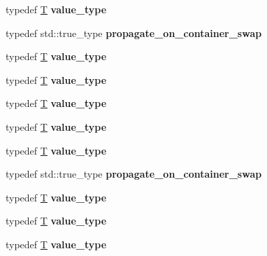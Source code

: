 \begin{DoxyCompactItemize}
typedef \mbox{\hyperlink{struct_t}{T}} {\bfseries value\+\_\+type}
\item 
\mbox{\label{structsome__alloc_aad61c49c6ad5f1ca6dfb3f5d38d70d57}} 
typedef std\+::true\+\_\+type {\bfseries propagate\+\_\+on\+\_\+container\+\_\+swap}
\item 
\mbox{\label{structsome__alloc_a41022544a2b3ffeb4ffce92f759eb30b}} 
typedef \mbox{\hyperlink{struct_t}{T}} {\bfseries value\+\_\+type}
\item 
\mbox{\label{structsome__alloc_a41022544a2b3ffeb4ffce92f759eb30b}} 
typedef \mbox{\hyperlink{struct_t}{T}} {\bfseries value\+\_\+type}
\item 
\mbox{\label{structsome__alloc_a41022544a2b3ffeb4ffce92f759eb30b}} 
typedef \mbox{\hyperlink{struct_t}{T}} {\bfseries value\+\_\+type}
\item 
\mbox{\label{structsome__alloc_a41022544a2b3ffeb4ffce92f759eb30b}} 
typedef \mbox{\hyperlink{struct_t}{T}} {\bfseries value\+\_\+type}
\item 
\mbox{\label{structsome__alloc_a41022544a2b3ffeb4ffce92f759eb30b}} 
typedef \mbox{\hyperlink{struct_t}{T}} {\bfseries value\+\_\+type}
\item 
\mbox{\label{structsome__alloc_aad61c49c6ad5f1ca6dfb3f5d38d70d57}} 
typedef std\+::true\+\_\+type {\bfseries propagate\+\_\+on\+\_\+container\+\_\+swap}
\item 
\mbox{\label{structsome__alloc_a41022544a2b3ffeb4ffce92f759eb30b}} 
typedef \mbox{\hyperlink{struct_t}{T}} {\bfseries value\+\_\+type}
\item 
\mbox{\label{structsome__alloc_a41022544a2b3ffeb4ffce92f759eb30b}} 
typedef \mbox{\hyperlink{struct_t}{T}} {\bfseries value\+\_\+type}
\item 
\mbox{\label{structsome__alloc_a41022544a2b3ffeb4ffce92f759eb30b}} 
typedef \mbox{\hyperlink{struct_t}{T}} {\bfseries value\+\_\+type}
\item 

\end{DoxyCompactItemize}
